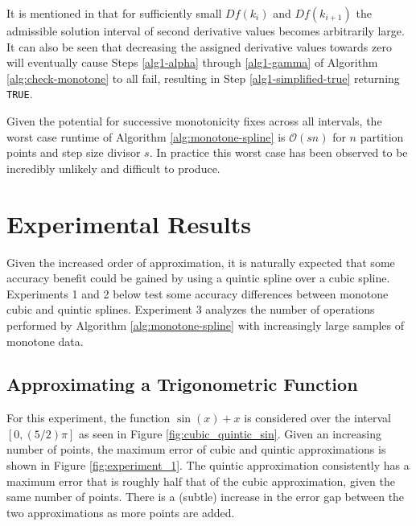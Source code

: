 \documentclass{scspaperproc}
\theoremstyle{scsthe}
\begin{document}

It is mentioned in  that for sufficiently small $Df(k_i)$ and $Df(k_{i+1})$ the admissible solution interval of second derivative values becomes arbitrarily large. It can also be seen that decreasing the assigned derivative values towards zero will eventually cause Steps \ref{alg1-alpha} through \ref{alg1-gamma} of Algorithm \ref{alg:check-monotone} to all fail, resulting in Step \ref{alg1-simplified-true} returning \texttt{TRUE}.

Given the potential for successive monotonicity fixes across all intervals, the worst case runtime of Algorithm \ref{alg:monotone-spline} is $\mathcal{O}(s n)$ for $n$ partition points and step size divisor $s$. In practice this worst case has been observed to be incredibly unlikely and difficult to produce.

\section{Experimental Results}

Given the increased order of approximation, it is naturally expected that some accuracy benefit could be gained by using a quintic spline over a cubic spline. Experiments 1 and 2 below test some accuracy differences between monotone cubic and quintic splines. Experiment 3 analyzes the number of operations performed by Algorithm \ref{alg:monotone-spline} with increasingly large samples of monotone data.

\subsection{Approximating a Trigonometric Function}

For this experiment, the function $\sin(x) + x$ is considered over the interval $[0,(5/2)\pi]$ as seen in Figure \ref{fig:cubic_quintic_sin}. Given an increasing number of points, the maximum error of cubic and quintic approximations is shown in Figure \ref{fig:experiment_1}. The quintic approximation consistently has a maximum error that is roughly half that of the cubic approximation, given the same number of points. There is a (subtle) increase in the error gap between the two approximations as more points are added.
\end{document}
